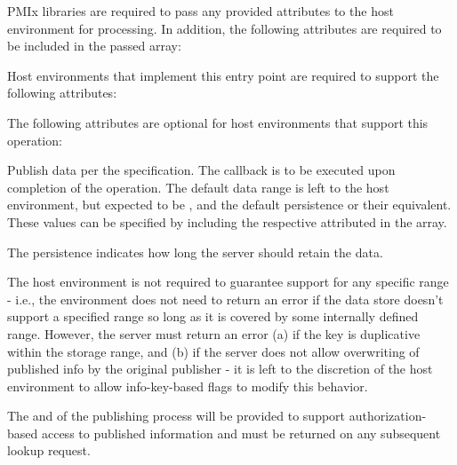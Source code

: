 \reqattrstart
\ac{PMIx} libraries are required to pass any provided attributes to the host environment for processing. In addition, the following attributes are required to be included in the passed  array:


\divider

Host environments that implement this entry point are required to support the following attributes:


\reqattrend

\optattrstart
The following attributes are optional for host environments that support this operation:


\optattrend

\descr

Publish data per the  specification.
The callback is to be executed upon completion of the operation.
The default data range is left to the host environment, but expected to be , and the default persistence  or their equivalent.
These values can be specified by including the respective attributed in the  array.

The persistence indicates how long the server should retain the data.

\advicermstart
The host environment is not required to guarantee support for any specific range - i.e., the environment does not need to return an error if the data store doesn't support a specified range so long as it is covered by some internally defined range.
However, the server must return an error (a) if the key is duplicative within the storage range, and (b) if the server does not allow overwriting of published info by the original publisher - it is left to the discretion of the host environment to allow info-key-based flags to modify this behavior.

The  and  of the publishing process will be provided to support authorization-based access to published information and must be returned on any subsequent lookup request.
\advicermend

\subsection{}

